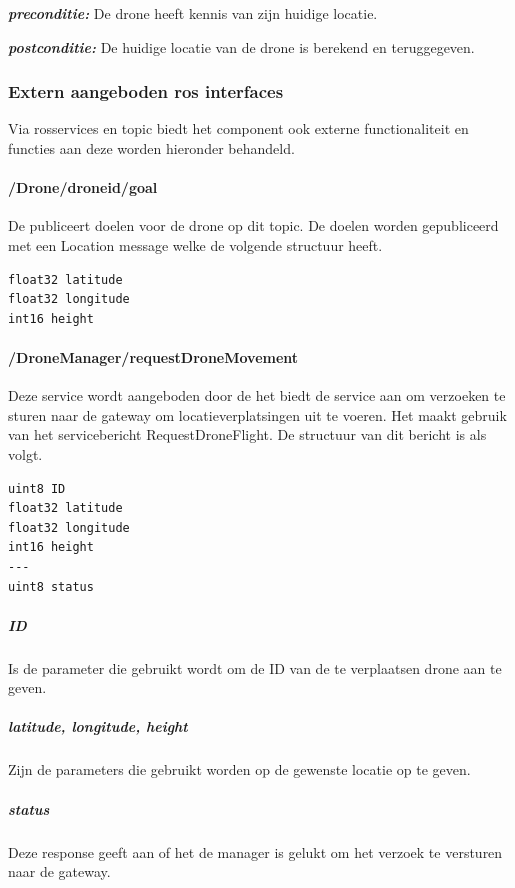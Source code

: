 \documentclass[a4paper, 11pt, oneside]{report}
\begin{document}
\textbf{\textit{preconditie:}} De drone heeft kennis van zijn huidige locatie.

\textbf{\textit{postconditie:}} De huidige locatie van de drone is berekend en teruggegeven.

\subsubsection{Extern aangeboden ros interfaces}
\label{DetailedDesign:ros:extern:rosinterfaces}
Via rosservices en topic biedt het component ook externe functionaliteit en functies aan deze worden hieronder behandeld.

\paragraph{/Drone/drone\textunderscore id/goal}
\label{DetailedDesign:ros:extern:rosinterfaces:topic:goal}
De  publiceert doelen voor de drone op dit topic.
De doelen worden gepubliceerd met een Location message welke de volgende structuur heeft.

\begin{lstlisting}
float32 latitude
float32 longitude
int16 height
\end{lstlisting}


\paragraph{/DroneManager/requestDroneMovement}
\label{DetailedDesign:ros:extern:rosinterfaces:service:requestDronemovement}

Deze service wordt aangeboden door de  het biedt de service aan om verzoeken te sturen naar de gateway om locatieverplatsingen uit te voeren. Het maakt gebruik van het servicebericht RequestDroneFlight. De structuur van dit bericht is als volgt.

\begin{lstlisting}
uint8 ID
float32 latitude
float32 longitude
int16 height
---
uint8 status
\end{lstlisting}

\subparagraph{ID} Is de parameter die gebruikt wordt om de ID van de te verplaatsen drone aan te geven.
\subparagraph{latitude, longitude, height} Zijn de parameters die gebruikt worden op de gewenste locatie op te geven.
\subparagraph{status} Deze response geeft aan of het de manager is gelukt om het verzoek te versturen naar de gateway.
\end{document}
